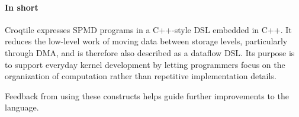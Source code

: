 \paragraph*{In short}

Croqtile expresses SPMD programs in a C++-style DSL embedded in C++. It reduces the low-level work of moving data between storage levels, particularly through DMA, and is therefore also described as a dataflow DSL. Its purpose is to support everyday kernel development by letting programmers focus on the organization of computation rather than repetitive implementation details.

Feedback from using these constructs helps guide further improvements to the language.
